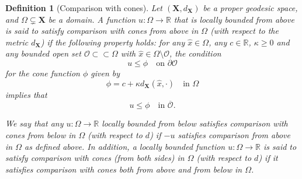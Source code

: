\documentclass[12pt, reqno]{amsart}
\newtheorem{definition}{Definition}%
\newcommand{\R}{\mathbb{R}}
\def\R{{\mathbb R}}
\def\X{{\mathbf X}}
\def\O{{\mathcal O}}
\begin{document}
\begin{definition}[Comparison with cones]\label{def cpc}
Let $(\X, d_\X)$ be a proper geodesic space, and $\Omega\subsetneq \X$ be a domain.
 A  function $u: \Omega\to \R$ that is locally bounded from above is %
said to %
satisfy comparison with cones from above in $\Omega$ (with respect to the metric $d_\X$) if the following property holds: for any $\hat{x}\in \Omega$, any $c\in \R$, $\kappa\geq 0$ and any bounded open set $\O\subset\subset \Omega$ with $\hat{x}\in\Omega\setminus\O$, the condition 
\begin{equation}\label{comp cone1}
u\leq \phi\quad \text{on $\partial \O$}
\end{equation}
for the cone function $\phi$ given by 
\begin{equation}\label{cone above}
\phi=c+\kappa d_\X(\hat{x}, \cdot)\quad \text{in $\Omega$}
\end{equation}
implies that 
\begin{equation}\label{comp cone2}
u\leq \phi\quad \text{in $\overline{\O}$.}
\end{equation}

We say that any $u: \Omega\to \R$ locally bounded from below satisfies comparison with cones from below in $\Omega$ (with respect to $d$) if $-u$ satisfies comparison from above in $\Omega$ as defined above. In addition, a locally bounded function $u: \Omega\to \R$ is said to satisfy comparison with cones (from both sides) in $\Omega$ (with respect to $d$) if it satisfies comparison with cones both from above and from below in $\Omega$. 
\end{definition}
\end{document}
